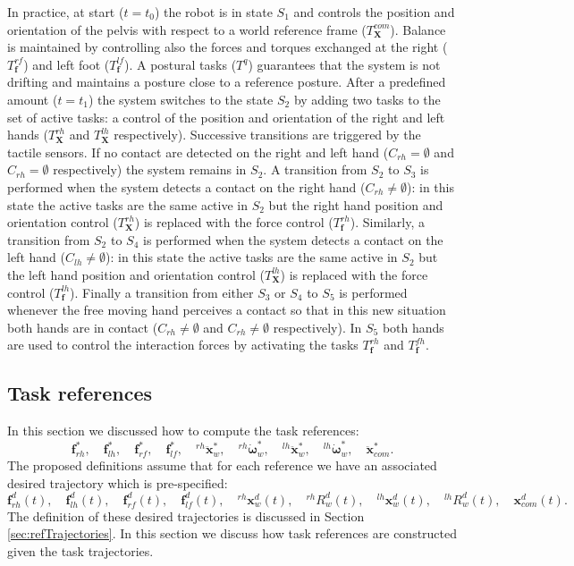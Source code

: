 \documentclass[12pt,a4paper,twoside]{article}
\begin{document}
In practice, at start ($t = t_0$) the robot is in state $S_1$ and controls the position and orientation of the pelvis with respect to a world reference frame ($T^{com}_{\bm X}$). Balance is maintained by controlling also the forces and torques exchanged at the right ($T^{rf}_{\bm f}$) and left foot ($T^{lf}_{\bm f}$). A postural tasks ($T^q$) guarantees that the system is not drifting and maintains a posture close to a reference posture. After a predefined amount ($t = t_1$) the system switches to the state $S_2$ by adding two tasks to the set of active tasks: a control of the position and orientation of the right and left hands ($T^{rh}_{\bm X}$ and $T^{lh}_{\bm X}$ respectively). Successive transitions are triggered by the tactile sensors. If no contact are detected on the right and left hand ($C_{rh} = \emptyset$ and $C_{rh} = \emptyset$ respectively) the system remains in $S_2$. A transition from $S_2$ to $S_3$ is performed when the system detects a contact on the right hand ($C_{rh} \neq \emptyset$): in this state the active tasks are the same active in $S_2$ but the right hand position and orientation control ($T^{rh}_{\bm X}$) is replaced with the force control ($T^{rh}_{\bm f}$). Similarly, a transition from $S_2$ to $S_4$ is performed when the system detects a contact on the left hand ($C_{lh} \neq \emptyset$): in this state the active tasks are the same active in $S_2$ but the left hand position and orientation control ($T^{lh}_{\bm X}$) is replaced with the force control ($T^{lh}_{\bm f}$). Finally a transition from either $S_3$ or $S_4$ to $S_5$ is performed whenever the free moving hand perceives a contact so that in this new situation both hands are in contact ($C_{rh} \neq \emptyset$ and $C_{rh} \neq \emptyset$ respectively). In $S_5$ both hands are used to control the interaction forces by activating the tasks $T^{rh}_{\bm f}$ and $T^{fh}_{\bm f}$.

\subsection{Task references} \label{sec:taskReferences}

In this section we discussed how to compute the task references:
$$
{\bm f}^*_{rh}, \quad{\bm f}^*_{lh}, \quad {\bm f}^*_{rf},  \quad {\bm f}^*_{lf}, \quad ^{rh}{\ddot {\bm x}}^*_w, \quad {}^{rh}{\dot {\bm \omega}}_w^* , \quad ^{lh}{\ddot {\bm x}}^*_w, \quad {}^{lh}{\dot {\bm \omega}}_w^*, \quad \ddot {\bm x}^*_{com}.
$$
The proposed definitions assume that for each reference we have an associated desired trajectory which is pre-specified: 
$$
{\bm f}^d_{rh} (t), \quad{\bm f}^d_{lh}(t), \quad {\bm f}^d_{rf}(t),  \quad {\bm f}^d_{lf}(t), \quad ^{rh}{ {\bm x}}^d_w(t), \quad {}^{rh}{ {R}}_w^d(t) , \quad ^{lh}{ {\bm x}}^d_w(t), \quad {}^{lh}{ {R}}_w^d(t), \quad  {\bm x}^d_{com}(t).
$$
The definition of these desired trajectories is discussed in Section \ref{sec:refTrajectories}. In this section we discuss how task references are constructed given the task trajectories.
\end{document}
